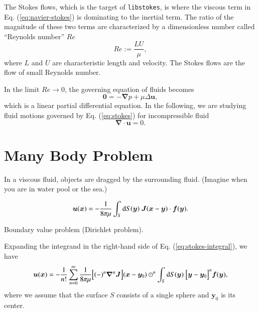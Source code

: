 \documentclass{book}
\begin{document}
The Stokes flows, which is the target of {\tt libstokes},
is where the viscous term in Eq. (\ref{eq:navier-stokes})
is dominating to the inertial term.
The ratio of the magnitude of these two terms are characterized
by a dimensionless number called ``Reynolds number'' $Re$
\begin{equation}
  Re
  :=
  \frac{LU}{\mu}
  ,
\end{equation}
where $L$ and $U$ are characteristic length and velocity.
The Stokes flows are the flow of small Reynolds number.

In the limit $Re\rightarrow 0$,
the governing equation of fluids becomes
\begin{equation}
  \bm{0}
  =
  -
  \bm{\nabla}
  p
  +
  \mu
  \Delta
  \bm{u}
  ,
  \label{eq:stokes}
\end{equation}
which is a linear partial differential equation.
In the following, we are studying fluid motions
governed by Eq. (\ref{eq:stokes})
for incompressible fluid
\begin{equation}
  \bm{\nabla}
  \cdot
  \bm{u}
  =
  0
  .
\end{equation}


\section{Many Body Problem}
In a viscous fluid, objects are dragged by the surrounding fluid.
(Imagine when you are in water pool or the sea.)


\begin{equation}
  \bm{u}
  (\bm{x})
  =
  -
  \frac{1}{8\pi\mu}
  \int_S
  {\rm d}S(\bm{y})\ 
  \bm{J}(\bm{x}-\bm{y})
  \cdot
  \bm{f}(\bm{y})
  .
  \label{eq:stokes-integral}
\end{equation}

Boundary value problem (Dirichlet problem).

Expanding the integrand in the right-hand side
of Eq. (\ref{eq:stokes-integral}),
we have
\begin{equation}
  \bm{u}
  (\bm{x})
  =
  -
  \frac{1}{n!}
  \sum_{n=0}^{\infty}
  \frac{1}{8\pi\mu}
  \Bigl[
    (-)^n
    \bm{\nabla}^n
    \bm{J}
  \Bigr]
  (\bm{x}-\bm{y}_0)
  \odot^n
  \int_S
  {\rm d}S(\bm{y})\ 
  \Bigl[
    \bm{y}
    -
    \bm{y}_0
  \Bigr]^n
  \bm{f}(\bm{y})
  ,
\end{equation}
where we assume that the surface $S$ consists of a single sphere
and $\bm{y}_0$ is its center.
\end{document}
